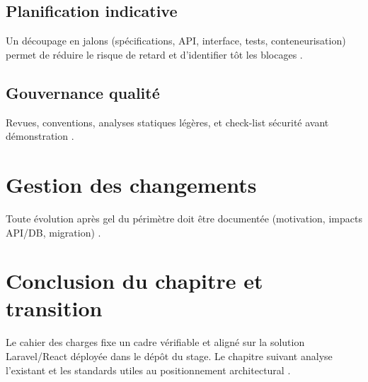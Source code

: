 \subsection{Planification indicative}

Un découpage en jalons (spécifications, API, interface, tests, conteneurisation) permet de réduire le risque de retard et d'identifier tôt les blocages \cite{pressman2014}.

\subsection{Gouvernance qualité}

Revues, conventions, analyses statiques légères, et check-list sécurité avant démonstration \cite{owasp2021,sommerville2016}.

\section{Gestion des changements}

Toute évolution après gel du périmètre doit être documentée (motivation, impacts API/DB, migration) \cite{kleppmann2017}.

\section{Conclusion du chapitre et transition}

Le cahier des charges fixe un cadre vérifiable et aligné sur la solution Laravel/React déployée dans le dépôt du stage. Le chapitre suivant analyse l'existant et les standards utiles au positionnement architectural \cite{bass2021,newman2021}.
